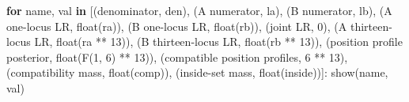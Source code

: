 \documentclass[
]{article}
\newenvironment{Shaded}{}{}
\newcommand{\BuiltInTok}[1]{\textcolor[rgb]{0.00,0.50,0.00}{#1}}
\newcommand{\ControlFlowTok}[1]{\textcolor[rgb]{0.00,0.44,0.13}{\textbf{#1}}}
\newcommand{\DecValTok}[1]{\textcolor[rgb]{0.25,0.63,0.44}{#1}}
\newcommand{\KeywordTok}[1]{\textcolor[rgb]{0.00,0.44,0.13}{\textbf{#1}}}
\newcommand{\NormalTok}[1]{#1}
\newcommand{\OperatorTok}[1]{\textcolor[rgb]{0.40,0.40,0.40}{#1}}
\newcommand{\StringTok}[1]{\textcolor[rgb]{0.25,0.44,0.63}{#1}}
\begin{document}
\begin{Shaded}
\begin{Highlighting}[]
    \ControlFlowTok{for}\NormalTok{ name, val }\KeywordTok{in}\NormalTok{ [(}\StringTok{\textquotesingle{}denominator\textquotesingle{}}\NormalTok{, den), (}\StringTok{\textquotesingle{}A numerator\textquotesingle{}}\NormalTok{, la),}
\NormalTok{                      (}\StringTok{\textquotesingle{}B numerator\textquotesingle{}}\NormalTok{, lb), (}\StringTok{\textquotesingle{}A one{-}locus LR\textquotesingle{}}\NormalTok{, }\BuiltInTok{float}\NormalTok{(ra)),}
\NormalTok{                      (}\StringTok{\textquotesingle{}B one{-}locus LR\textquotesingle{}}\NormalTok{, }\BuiltInTok{float}\NormalTok{(rb)), (}\StringTok{\textquotesingle{}joint LR\textquotesingle{}}\NormalTok{, }\DecValTok{0}\NormalTok{),}
\NormalTok{                      (}\StringTok{\textquotesingle{}A thirteen{-}locus LR\textquotesingle{}}\NormalTok{, }\BuiltInTok{float}\NormalTok{(ra }\OperatorTok{**} \DecValTok{13}\NormalTok{)),}
\NormalTok{                      (}\StringTok{\textquotesingle{}B thirteen{-}locus LR\textquotesingle{}}\NormalTok{, }\BuiltInTok{float}\NormalTok{(rb }\OperatorTok{**} \DecValTok{13}\NormalTok{)),}
\NormalTok{                      (}\StringTok{\textquotesingle{}position profile posterior\textquotesingle{}}\NormalTok{, }\BuiltInTok{float}\NormalTok{(F(}\DecValTok{1}\NormalTok{, }\DecValTok{6}\NormalTok{) }\OperatorTok{**} \DecValTok{13}\NormalTok{)),}
\NormalTok{                      (}\StringTok{\textquotesingle{}compatible position profiles\textquotesingle{}}\NormalTok{, }\DecValTok{6} \OperatorTok{**} \DecValTok{13}\NormalTok{),}
\NormalTok{                      (}\StringTok{\textquotesingle{}compatibility mass\textquotesingle{}}\NormalTok{, }\BuiltInTok{float}\NormalTok{(comp)),}
\NormalTok{                      (}\StringTok{\textquotesingle{}inside{-}set mass\textquotesingle{}}\NormalTok{, }\BuiltInTok{float}\NormalTok{(inside))]:}
\NormalTok{        show(name, val)}



\end{Highlighting}
\end{Shaded}
\end{document}
